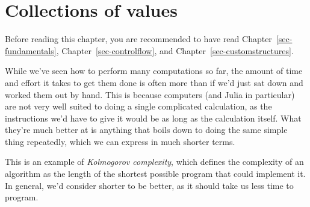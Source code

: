 \documentclass[
  letterpaper,
  DIV=11,
  numbers=noendperiod]{scrreprt}
\begin{document}
\hypertarget{sec-arrays}{%
\chapter{Collections of values}\label{sec-arrays}}

\begin{tcolorbox}[enhanced jigsaw, toprule=.15mm, opacitybacktitle=0.6, leftrule=.75mm, breakable, coltitle=black, bottomrule=.15mm, colbacktitle=quarto-callout-important-color!10!white, bottomtitle=1mm, rightrule=.15mm, title=\textcolor{quarto-callout-important-color}{\faExclamation}\hspace{0.5em}{Prerequisites}, colframe=quarto-callout-important-color-frame, left=2mm, colback=white, opacityback=0, arc=.35mm, toptitle=1mm, titlerule=0mm]

Before reading this chapter, you are recommended to have read
Chapter~\ref{sec-fundamentals}, Chapter~\ref{sec-controlflow}, and
Chapter~\ref{sec-customstructures}.

\end{tcolorbox}

While we've seen how to perform many computations so far, the amount of
time and effort it takes to get them done is often more than if we'd
just sat down and worked them out by hand. This is because computers
(and Julia in particular) are not very well suited to doing a single
complicated calculation, as the instructions we'd have to give it would
be as long as the calculation itself. What they're much better at is
anything that boils down to doing the same simple thing repeatedly,
which we can express in much shorter terms.

\begin{tcolorbox}[enhanced jigsaw, toprule=.15mm, opacitybacktitle=0.6, leftrule=.75mm, breakable, coltitle=black, bottomrule=.15mm, colbacktitle=quarto-callout-note-color!10!white, bottomtitle=1mm, rightrule=.15mm, title=\textcolor{quarto-callout-note-color}{\faInfo}\hspace{0.5em}{Note}, colframe=quarto-callout-note-color-frame, left=2mm, colback=white, opacityback=0, arc=.35mm, toptitle=1mm, titlerule=0mm]

This is an example of \emph{Kolmogorov complexity}, which defines the
complexity of an algorithm as the length of the shortest possible
program that could implement it. In general, we'd consider shorter to be
better, as it should take us less time to program.

\end{tcolorbox}
\end{document}
